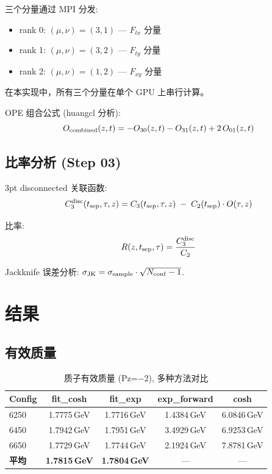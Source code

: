 \documentclass[12pt,a4paper]{ctexart}
\begin{document}
三个分量通过 MPI 分发:
\begin{itemize}
  \item rank 0: $(\mu,\nu) = (3,1)$ — $F_{tx}$ 分量
  \item rank 1: $(\mu,\nu) = (3,2)$ — $F_{ty}$ 分量
  \item rank 2: $(\mu,\nu) = (1,2)$ — $F_{xy}$ 分量
\end{itemize}

在本实现中，所有三个分量在单个 GPU 上串行计算。

OPE 组合公式 (huangcl 分析):
\begin{equation}
  O_{\rm combined}(z,t) = -O_{30}(z,t) - O_{31}(z,t) + 2\,O_{01}(z,t)
\end{equation}

\subsection{比率分析 (Step 03)}

3pt disconnected 关联函数:
\begin{equation}
  C_3^{\rm disc}(t_{\rm sep}, \tau, z) =
  C_3(t_{\rm sep}, \tau, z) \;-\;
  C_2(t_{\rm sep}) \cdot O(\tau, z)
\end{equation}

比率:
\begin{equation}
  R(z, t_{\rm sep}, \tau) = \frac{C_3^{\rm disc}}{C_2}
\end{equation}

Jackknife 误差分析: $\sigma_{\rm JK} = \sigma_{\rm sample} \cdot \sqrt{N_{\rm conf}-1}$.

\section{结果}

\subsection{有效质量}

\begin{table}[htbp]
\centering
\caption{质子有效质量 (Pz=$-$2), 多种方法对比}
\label{tab:meff}
\begin{tabular}{lcccc}
\toprule
\textbf{Config} & \textbf{fit\_cosh} & \textbf{fit\_exp} & \textbf{exp\_forward} & \textbf{cosh} \\
\midrule
6250 & 1.7775\,GeV & 1.7716\,GeV & 1.4384\,GeV & 6.0846\,GeV \\
6450 & 1.7942\,GeV & 1.7951\,GeV & 3.4929\,GeV & 6.9253\,GeV \\
6650 & 1.7729\,GeV & 1.7744\,GeV & 2.1924\,GeV & 7.8781\,GeV \\
\midrule
\textbf{平均} & \textbf{1.7815\,GeV} & \textbf{1.7804\,GeV} & --- & --- \\
\bottomrule
\end{tabular}
\end{table}
\end{document}
